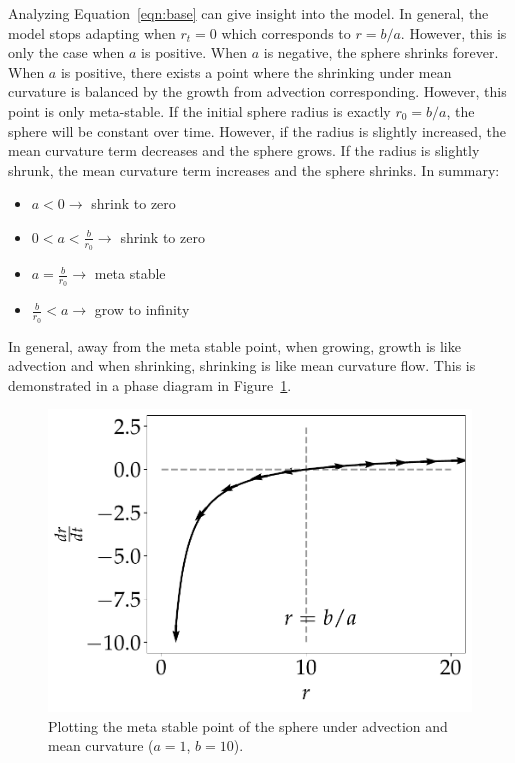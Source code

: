 \documentclass[journal]{IEEEtran}
\begin{document}
Analyzing Equation~\ref{eqn:base} can give insight into the model.
In general, the model stops adapting when $r_t = 0$ which corresponds to $r = b/a$.
However, this is only the case when $a$ is positive.
When $a$ is negative, the sphere shrinks forever.
When $a$ is positive, there exists a point where the shrinking under mean curvature is balanced by the growth from advection corresponding.
However, this point is only meta-stable.
If the initial sphere radius is exactly $r_0 = b/a$, the sphere will be constant over time.
However, if the radius is slightly increased, the mean curvature term decreases and the sphere grows.
If the radius is slightly shrunk, the mean curvature term increases and the sphere shrinks.
In summary:
\begin{itemize}
  \item $a < 0 \rightarrow$ shrink to zero
  \item $0 < a < \frac{b}{r_0} \rightarrow $ shrink to zero
  \item $ a = \frac{b}{r_0} \rightarrow $ meta stable
  \item $\frac{b}{r_0} < a \rightarrow $ grow to infinity
\end{itemize}
In general, away from the meta stable point, when growing, growth is like advection and when shrinking, shrinking is like mean curvature flow.
This is demonstrated in a phase diagram in Figure~\ref{fig:loss}.

\begin{figure}[b]
  \centering
    \includegraphics[width=0.9\linewidth]{loss}%
  \caption{Plotting the meta stable point of the sphere under advection and mean curvature ($a = 1$, $b = 10$).}
  \label{fig:loss}
\end{figure}
\end{document}
